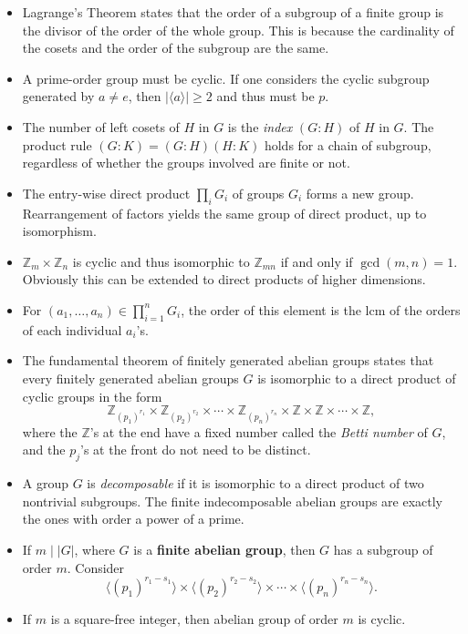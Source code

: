 \documentclass{article}
\newcommand{\Z}{\mathbb{Z}}
\newcommand{\ga}{\langle a \rangle}
\begin{document}
\begin{itemize}
    \item Lagrange's Theorem states that the order of a subgroup of a finite group is the divisor of the order of the whole group. This is because the cardinality of the cosets and the order of the subgroup are the same.
    \item A prime-order group must be cyclic. If one considers the cyclic subgroup generated by $a \not= e$, then $|\ga| \geq 2$ and thus must be $p$.
    \item The number of left cosets of $H$ in $G$ is the \textit{index} $(G:H)$ of $H$ in $G$. The product rule $(G:K) = (G:H)(H:K)$ holds for a chain of subgroup, regardless of whether the groups involved are finite or not.
    \item The entry-wise direct product $\prod_{i} G_i$ of groups $G_i$ forms a new group. Rearrangement of factors yields the same group of direct product, up to isomorphism.
    \item $\Z_m \times \Z_n$ is cyclic and thus isomorphic to $\Z_{mn}$ if and only if $\gcd(m,n) = 1$. Obviously this can be extended to direct products of higher dimensions.
    \item For $(a_1, \dots, a_n) \in \prod_{i=1}^n G_i$, the order of this element is the lcm of the orders of each individual $a_i$'s.
    \item The fundamental theorem of finitely generated abelian groups states that every finitely generated abelian groups $G$ is isomorphic to a direct product of cyclic groups in the form $$\Z_{(p_1)^{r_1}} \times \Z_{(p_2)^{r_2}} \times \cdots \times \Z_{(p_n)^{r_n}} \times \Z \times \Z \times \cdots \times \Z,$$ where the $\Z$'s at the end have a fixed number called the \textit{Betti number} of $G$, and the $p_j$'s at the front do not need to be distinct.
    \item A group $G$ is \textit{decomposable} if it is isomorphic to a direct product of two nontrivial subgroups. The finite indecomposable abelian groups are exactly the ones with order a power of a prime.
    \item If $m \mid |G|$, where $G$ is a \textbf{finite abelian group}, then $G$ has a subgroup of order $m$. Consider $$\langle (p_1)^{r_1 - s_1} \rangle \times \langle (p_2)^{r_2 - s_2} \rangle \times \cdots \times \langle (p_n)^{r_n - s_n} \rangle.$$
    \item If $m$ is a square-free integer, then abelian group of order $m$ is cyclic.
\end{itemize}
\end{document}
